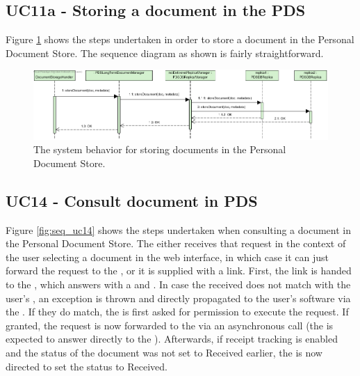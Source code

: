 \subsection{UC11a - Storing a document in the PDS} 
Figure \ref{fig:seq_uc11a} shows the steps undertaken in order to store a document in the Personal Document Store. The sequence diagram as shown is fairly straightforward.

\begin{figure}[!htp]
    \centering
    \includegraphics[width=\textwidth]{figures/UC11a - Storing a document in the PDS.png}
    \caption{The system behavior for storing documents in the Personal Document Store.
        }\label{fig:seq_uc11a}
\end{figure}

\subsection{UC14 - Consult document in PDS}
Figure \ref{fig:seq_uc14} shows the steps undertaken when consulting a document in the Personal Document Store. The  either receives that request in the context of the user selecting a document in the web interface, in which case it can just forward the request to the , or it is supplied with a link. First, the link is handed to the  , which answers with a  and . In case the received  does not match with the user's , an exception is thrown and directly propagated to the user's software via the . If they do match, the  is first asked for permission to execute the request. If granted, the request is now forwarded to the  via an asynchronous call (the  is expected to answer directly to the ). Afterwards, if receipt tracking is enabled and the status of the document was not set to Received earlier, the  is now directed to set the status to Received.

